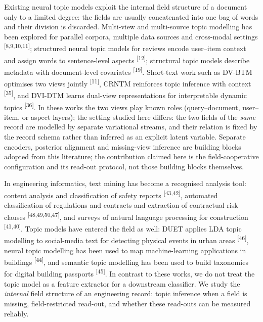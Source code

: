 \documentclass{article}
\begin{document}
Existing neural topic models exploit the internal field structure of a document only to a limited
degree: the fields are usually concatenated into one bag of words and their division is discarded.
Multi-view and multi-source topic modelling has been explored for parallel corpora, multiple data
sources and cross-modal settings
\textsuperscript{[8,9,10,11]}; structured
neural topic models for reviews encode user--item context and assign words to sentence-level
aspects \textsuperscript{[12]}; structural topic models describe metadata with
document-level covariates \textsuperscript{[19]}. Short-text work such as DV-BTM optimises two
views jointly \textsuperscript{[11]}, CRNTM reinforces topic
inference with context \textsuperscript{[35]}, and DVI-DTM learns dual-view representations for
interpretable dynamic topics \textsuperscript{[36]}. In these works the two views play known roles
(query--document, user--item, or aspect layers); the setting studied here differs: the two fields
of the \emph{same} record are modelled by separate variational streams, and their relation is
fixed by the record schema rather than inferred as an explicit latent variable.  Separate
encoders, posterior alignment and missing-view inference are building blocks adopted from this
literature; the contribution claimed here is the field-cooperative configuration and its
read-out protocol, not those building blocks themselves.

In engineering informatics, text mining has become a recognised analysis tool: content analysis and
classification of safety reports \textsuperscript{[43,42]}, automated classification
of regulations and contracts and extraction of contractual risk clauses
\textsuperscript{[48,49,50,47]}, and surveys of natural language processing for
construction \textsuperscript{[41,40]}. Topic models have entered the field as well: DUET
applies LDA topic modelling to social-media text for detecting physical events in urban areas
\textsuperscript{[46]}, neural topic modelling has
been used to map machine-learning applications in buildings \textsuperscript{[44]}, and semantic
topic modelling has been used to build taxonomies for digital building passports \textsuperscript{[45]}. In contrast to
these works, we do not treat the topic model as a feature extractor for a downstream classifier.
We study the \emph{internal} field structure of an engineering record: topic inference when a field
is missing, field-restricted read-out, and whether these read-outs can be measured reliably.
\end{document}
